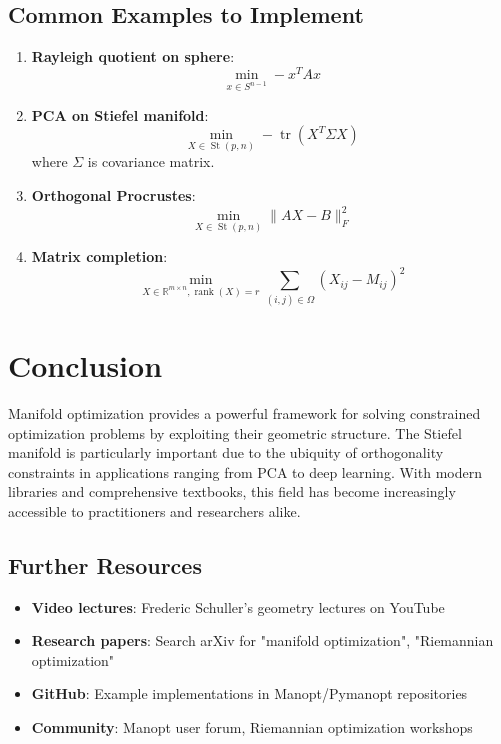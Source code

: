 \documentclass[11pt]{article}
\begin{document}
\subsection{Common Examples to Implement}
\begin{enumerate}[label=\arabic*.]
    \item \textbf{Rayleigh quotient on sphere}:
    \[
    \min_{x \in S^{n-1}} -x^T A x
    \]
    
    \item \textbf{PCA on Stiefel manifold}:
    \[
    \min_{X \in \operatorname{St}(p,n)} -\operatorname{tr}(X^T \Sigma X)
    \]
    where $\Sigma$ is covariance matrix.
    
    \item \textbf{Orthogonal Procrustes}:
    \[
    \min_{X \in \operatorname{St}(p,n)} \|AX - B\|_F^2
    \]
    
    \item \textbf{Matrix completion}:
    \[
    \min_{X \in \mathbb{R}^{m \times n}, \operatorname{rank}(X)=r} \sum_{(i,j)\in\Omega} (X_{ij} - M_{ij})^2
    \]
\end{enumerate}

\section{Conclusion}
Manifold optimization provides a powerful framework for solving constrained optimization problems by exploiting their geometric structure. The Stiefel manifold is particularly important due to the ubiquity of orthogonality constraints in applications ranging from PCA to deep learning. With modern libraries and comprehensive textbooks, this field has become increasingly accessible to practitioners and researchers alike.

\subsection*{Further Resources}
\begin{itemize}
    \item \textbf{Video lectures}: Frederic Schuller's geometry lectures on YouTube
    \item \textbf{Research papers}: Search arXiv for "manifold optimization", "Riemannian optimization"
    \item \textbf{GitHub}: Example implementations in Manopt/Pymanopt repositories
    \item \textbf{Community}: Manopt user forum, Riemannian optimization workshops
\end{itemize}
\end{document}
